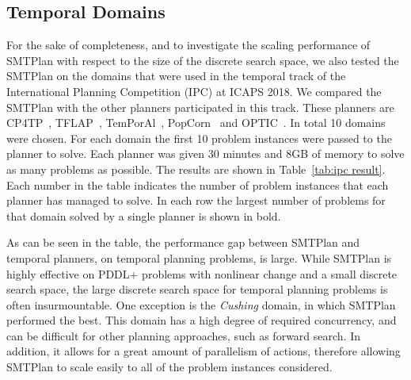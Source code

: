 \subsection{Temporal Domains}\label{sec:eval_pddl21}

For the sake of completeness, and to investigate the scaling performance of SMTPlan with respect to the size of the discrete search space, we also tested the SMTPlan on the domains that were used in the temporal track of the International Planning Competition (IPC) at ICAPS 2018.
We compared the SMTPlan with the other planners participated in this track. These planners are CP4TP~\cite{cp4tp}, TFLAP~\cite{tflap}, TemPorAl~\cite{temporal}, PopCorn~\cite{popcorn} and OPTIC~\cite{OPTIC}. 
In total 10 domains were chosen. For each domain the first 10 problem instances were passed to the planner to solve. Each planner was given 30 minutes and 8GB of memory to solve as many problems as possible. The results are shown in Table~\ref{tab:ipc result}.
Each number in the table indicates the number of problem instances that each planner has managed to solve. In each row the largest number of problems for that domain solved by a single planner is shown in bold. 

As can be seen in the table, the performance gap between SMTPlan and temporal planners, on temporal planning problems, is large. While SMTPlan is highly effective on PDDL+ problems with nonlinear change and a small discrete search space, the large discrete search space for temporal planning problems is often insurmountable. One exception is the \textit{Cushing} domain, in which SMTPlan performed the best. This domain has a high degree of required concurrency, and can be difficult for other planning approaches, such as forward search. In addition, it allows for a great amount of parallelism of actions, therefore allowing SMTPlan to scale easily to all of the problem instances considered.


